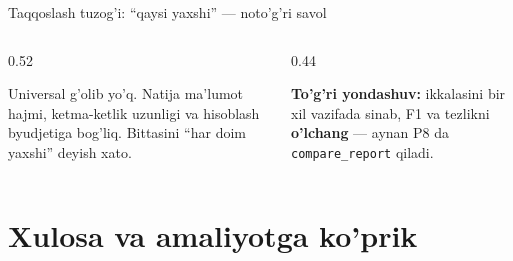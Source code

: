 \documentclass[aspectratio=169,11pt]{beamer}
\begin{document}
\begin{frame}{Taqqoslash tuzog'i: ``qaysi yaxshi'' --- noto'g'ri savol}
  \begin{columns}[T]
    \begin{column}{0.52\textwidth}
      \begin{tcolorbox}[warnbox,title=Kontekstga bog'liq]
        \small
        Universal g'olib yo'q. Natija ma'lumot hajmi, ketma-ketlik uzunligi va
        hisoblash byudjetiga bog'liq. Bittasini ``har doim yaxshi'' deyish xato.
      \end{tcolorbox}
    \end{column}
    \begin{column}{0.44\textwidth}
      \begin{tcolorbox}[okbox,top=2pt,bottom=2pt]
        \footnotesize
        \textbf{To'g'ri yondashuv:} ikkalasini bir xil vazifada sinab, F1 va
        tezlikni \textbf{o'lchang} --- aynan P8 da \texttt{compare\_report} qiladi.
      \end{tcolorbox}
    \end{column}
  \end{columns}
\end{frame}

\section[Xulosa]{Xulosa va amaliyotga ko'prik}
\end{document}
